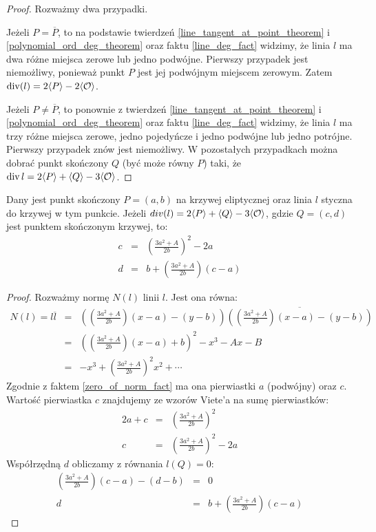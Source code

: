 \begin{proof}
Rozważmy dwa przypadki.

Jeżeli $P = \overline{P}$,
to na podstawie twierdzeń
\ref{line_tangent_at_point_theorem} i \ref{polynomial_ord_deg_theorem}
oraz faktu \ref{line_deg_fact} widzimy,
że linia $l$ ma dwa różne miejsca zerowe lub jedno podwójne.
Pierwszy przypadek jest niemożliwy,
ponieważ punkt $P$ jest jej podwójnym miejscem zerowym.
Zatem $\operatorname{div}(l) = 2\langle P\rangle - 2\langle\mathcal{O}\rangle$.

Jeżeli $P \neq \overline{P}$,
to ponownie z twierdzeń
\ref{line_tangent_at_point_theorem} i \ref{polynomial_ord_deg_theorem}
oraz faktu \ref{line_deg_fact} widzimy,
że linia $l$ ma trzy różne miejsca zerowe, jedno pojedyńcze i jedno podwójne
lub jedno potrójne.
Pierwszy przypadek znów jest niemożliwy.
W pozostałych przypadkach można dobrać punkt skończony $Q$
(być może równy $P$) taki,
że $\operatorname{div}{l} = 2\langle P\rangle + \langle Q\rangle - 3\langle\mathcal{O}\rangle$.
\end{proof}

\begin{theorem}
Dany jest punkt skończony $P = (a, b)$ na krzywej eliptycznej
oraz linia $l$ styczna do krzywej w tym punkcie.
Jeżeli $div(l) = 2\langle P\rangle + \langle Q\rangle - 3\langle\mathcal{O}\rangle$,
gdzie $Q = (c, d)$ jest punktem skończonym krzywej,
to:
\begin{eqnarray}
\label{tangent_line_third_point_x_eqn}
c & = & \left(\frac{3a^2 + A}{2b}\right)^2 - 2a \\
\label{tangent_line_third_point_y_eqn}
d & = & b + \left(\frac{3a^2 + A}{2b}\right)(c - a)
\end{eqnarray}
\end{theorem}

\begin{proof}
Rozważmy normę $N(l)$ linii $l$. Jest ona równa:
\begin{eqnarray*}
N(l) = l\overline{l}
& = & \left(\left(\frac{3a^2 + A}{2b}\right)(x - a) - (y - b)\right)
      \overline{
      \left(\left(\frac{3a^2 + A}{2b}\right)(x - a) - (y - b)\right)
      } \\
& = & \left(\left(\frac{3a^2+A}{2b}\right)(x-a) + b\right)^2 - x^3 - Ax - B \\
& = & -x^3 + \left(\frac{3a^2+A}{2b}\right)^2x^2 + \cdots
\end{eqnarray*}
Zgodnie z faktem \ref{zero_of_norm_fact}
ma ona pierwiastki $a$ (podwójny) oraz $c$.
Wartość pierwiastka $c$ znajdujemy ze wzorów Viete'a na sumę pierwiastków:
\begin{eqnarray*}
2a + c & = & \left(\frac{3a^2+A}{2b}\right)^2 \\
     c & = & \left(\frac{3a^2+A}{2b}\right)^2 - 2a
\end{eqnarray*}
Współrzędną $d$ obliczamy z równania $l(Q) = 0$:
\begin{eqnarray*}
\left(\frac{3a^2 + A}{2b}\right)(c - a) - (d - b) & = & 0 \\
d & = & b + \left(\frac{3a^2 + A}{2b}\right)(c - a)
\end{eqnarray*}
\end{proof}

